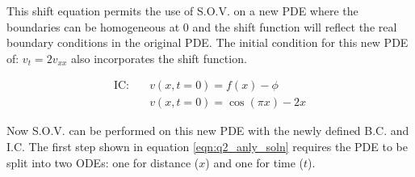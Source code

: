 \documentclass[12pt]{article}
\begin{document}
This shift equation permits the use of S.O.V. on a new PDE where the boundaries can be homogeneous at 0 and the shift function will reflect the real boundary conditions in the original PDE. The initial condition for this new PDE of: $v_t = 2v_{xx}$ also incorporates the shift function.

\begin{equation}
    \label{eqn:q2_initial_condition}
    \begin{aligned}
        \text{IC:}  & \quad v(x, t=0) = f(x) - \phi \\
        & \quad v(x, t=0) = \cos(\pi x) - 2x
    \end{aligned}
\end{equation}

Now S.O.V. can be performed on this new PDE with the newly defined B.C. and I.C. The first step shown in equation \ref{eqn:q2_anly_soln} requires the PDE to be split into two ODEs: one for distance ($x$) and one for time ($t$).
\end{document}
